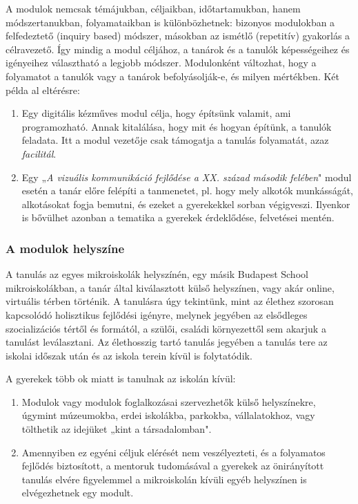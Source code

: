A modulok nemcsak témájukban, céljaikban, időtartamukban, hanem
módszertanukban, folyamataikban is különbözhetnek: bizonyos modulokban a
felfedeztető (inquiry based) módszer, másokban az ismétlő (repetitív)
gyakorlás a célravezető. Így mindig a modul céljához, a tanárok és a
tanulók képességeihez és igényeihez választható a legjobb módszer.
Modulonként változhat, hogy a folyamatot a tanulók vagy a tanárok
befolyásolják-e, és milyen mértékben. Két példa al eltérésre:

\begin{enumerate}
      \item Egy digitális kézműves modul célja, hogy építsünk valamit, ami
            programozható. Annak kitalálása, hogy mit és hogyan építünk, a
            tanulók
            feladata. Itt a modul vezetője csak támogatja a tanulás folyamatát,
            azaz
            \emph{facilitál}.

      \item Egy „\emph{A vizuális kommunikáció fejlődése a XX. század második
                  felében}"
            modul esetén a tanár előre felépíti a tanmenetet, pl. hogy mely
            alkotók munkásságát,
            alkotásokat
            fogja bemutni, és
            ezeket a gyerekekkel sorban végigveszi. Ilyenkor is bővülhet
            azonban a tematika a gyerekek érdeklődése, felvetései mentén.

\end{enumerate}

\subsubsection{A modulok helyszíne}

A tanulás az egyes mikroiskolák helyszínén, egy másik Budapest School
mikroiskolákban, a tanár által kiválasztott külső helyszínen,
vagy akár online, virtuális térben történik. A tanulásra úgy tekintünk, mint az
élethez szorosan kapcsolódó holisztikus fejlődési igényre,
melynek jegyében az elsődleges szocializációs tértől és formától, a szülői,
családi környezettől sem akarjuk a tanulást leválasztani. Az élethosszig
tartó tanulás jegyében a tanulás tere az iskolai időszak után és az
iskola terein kívül is folytatódik.

A gyerekek több ok miatt is tanulnak az iskolán kívül:

\begin{enumerate}
      \item Modulok vagy modulok foglalkozásai szervezhetők külső helyszínekre,
            úgymint múzeumokba, erdei
            iskolákba, parkokba, vállalatokhoz, vagy tölthetik az idejüket
            „kint a
            társadalomban".

      \item Amennyiben ez egyéni céljuk elérését nem veszélyezteti, és a
            folyamatos fejlődés biztosított, a mentoruk tudomásával a gyerekek
            az
            önirányított tanulás elvére figyelemmel a mikroiskolán kívüli egyéb
            helyszínen
            is elvégezhetnek egy modult.
\end{enumerate}

